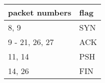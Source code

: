 \begin{center}
\begin{tabular}{| l | l |}
    \hline
    packet numbers & flag \\ \hline
    8, 9 & SYN \\ \hline
    9 - 21, 26, 27 & ACK \\ \hline
    11, 14 & PSH \\ \hline
    14, 26 & FIN \\ \hline
\end{tabular}
\end{center}
